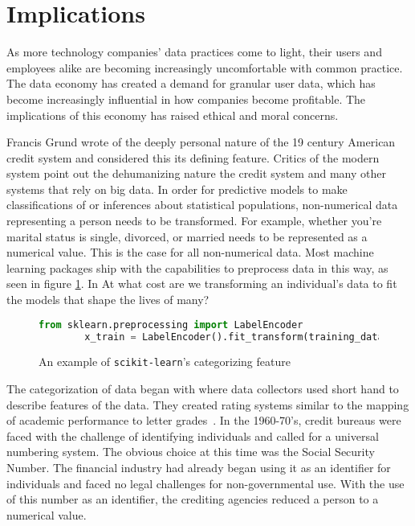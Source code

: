 \section{Implications}
As more technology companies' data practices come to light, their users and
employees alike are becoming increasingly uncomfortable with common practice.
The data economy has created a demand for granular user data, which has become
increasingly influential in how companies become profitable. The implications
of this economy has raised ethical and moral concerns.

Francis Grund wrote of the deeply personal nature of the 19 century
American credit system and considered this its defining feature. Critics of the
modern system point out the dehumanizing nature the credit system and many
other systems that rely on big data. In order for predictive models to make
classifications of or inferences about statistical populations, non-numerical
data representing a person needs to be transformed. For example, whether you're
marital status is single, divorced, or married needs to be represented as a
numerical value. This is the case for all non-numerical data. Most machine learning
packages ship with the capabilities to preprocess data in this way, as seen in figure \ref{fig:scikit}. In At what cost are
we transforming an individual's data to fit the models that shape the lives of
many? %

\begin{figure}[h]
\begin{lstlisting}[language=python, basicstyle=\sffamily]
        from sklearn.preprocessing import LabelEncoder
        x_train = LabelEncoder().fit_transform(training_data)
\end{lstlisting}
\caption{An example of \texttt{scikit-learn}'s categorizing feature~\cite{scikit-learn}}
		\label{fig:scikit}
\end{figure}

The categorization of data began with \mca where data collectors used short
hand to describe features of the data. They created rating systems similar to
the mapping of academic performance to letter
grades~\cite{lauer2017creditworthy}. In the 1960-70's, credit bureaus were
faced with the challenge of identifying individuals and called for a universal
numbering system. The obvious choice at this time was the Social Security
Number. The financial industry had already began using it as an identifier for
individuals and faced no legal challenges for non-governmental use. With the
use of this number as an identifier, the crediting agencies reduced a person to
a numerical value.

